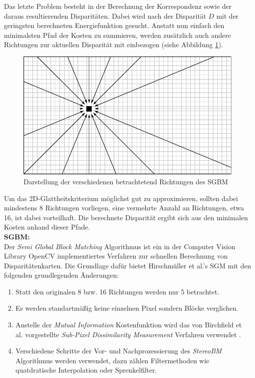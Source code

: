 \noindent
Das letzte Problem besteht in der Berechnung der Korrespondenz sowie der daraus resultierenden Disparitäten. Dabei wird nach der Disparität $D$ mit der geringsten berechneten Energiefunktion gesucht. Anstatt nun einfach den minimalsten Pfad der Kosten zu summieren, werden zusätzlich auch andere Richtungen zur aktuellen Disparität mit einbezogen (siehe Abbildung \ref{fig:sgm_directions}).

\begin{figure}[h]
	\centering
	\includegraphics[width=12cm]{img/sgm_directions.pdf}
	\caption{Darstellung der verschiedenen betrachtetend Richtungen des SGBM}
	\label{fig:sgm_directions}
\end{figure}

\noindent
Um das 2D-Glattheitskriterium möglichst gut zu approximieren,  sollten dabei mindestens 8 Richtungen vorliegen, eine vermehrte Anzahl an Richtungen, etwa 16, ist dabei vorteilhaft. Die berechnete Disparität ergibt sich aus den minimalen Kosten anhand dieser Pfade.\\

\noindent
\textbf{SGBM:} \\
Der \emph{Semi Global Block Matching} Algorithmus ist ein in der Computer Vision Library OpenCV implementiertes Verfahren zur schnellen Berechnung von Disparitätenkarten. Die Grundlage dafür bietet Hirschmüller et al.’s SGM \cite{hirschmueller2008sgm} mit den folgenden grundlegenden Änderungen:

\begin{enumerate}[label=C.\arabic*]
	\item Statt den originalen 8 bzw. 16 Richtungen werden nur 5 betrachtet. \label{item:differences_directions}
	\item Es werden  standartmäßig keine einzelnen Pixel sondern Blöcke verglichen. \label{item:differences_matching}
	\item Anstelle der \emph{Mutual Information} Kostenfunktion wird das von Birchfield et al. vorgestellte \emph{Sub-Pixel Dissimilarity Measurement} Verfahren verwendet \cite{birchfield-tomasi}.
	\item Verschiedene Schritte der Vor- und Nachprozessierung des \emph{StereoBM} Algorithmus werden verwendet, dazu zählen Filtermethoden wie quatdratische Interpolation oder Sprenkelfilter.
\end{enumerate}

